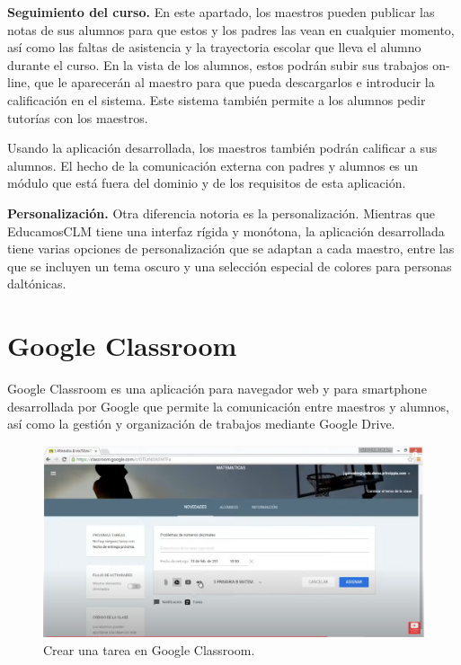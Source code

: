 \textbf {Seguimiento del curso.}
    En este apartado, los maestros pueden publicar las notas de sus alumnos para que estos y los padres las vean en cualquier momento, así como las faltas de asistencia y la trayectoria escolar que lleva el alumno durante el curso.
    En la vista de los alumnos, estos podrán subir sus trabajos on-line, que le aparecerán al maestro para que pueda descargarlos e introducir la calificación en el sistema. Este sistema también permite a los alumnos pedir tutorías con los maestros.
    
Usando la aplicación desarrollada, los maestros también podrán calificar a sus alumnos. El hecho de la comunicación externa con padres y alumnos es un módulo que está fuera del dominio y de los requisitos de esta aplicación.

\textbf {Personalización.} Otra diferencia notoria es la personalización. Mientras que EducamosCLM tiene una interfaz rígida y monótona, la aplicación desarrollada tiene varias opciones de personalización que se adaptan a cada maestro, entre las que se incluyen un tema oscuro y una selección especial de colores para personas daltónicas.


\section{Google Classroom}

Google Classroom es una aplicación para navegador web y para smartphone\cite{googleclassroom} desarrollada por Google que permite la comunicación entre maestros y alumnos, así como la gestión y organización de trabajos mediante Google Drive.

\begin{figure}[h]
\centering\includegraphics[width=1\linewidth]{figs/googleclassroom.png}
\caption{Crear una tarea en Google Classroom.\cite{googleclassroomyoutube}}
\label{Fig:googleclassroom}
\end{figure}

